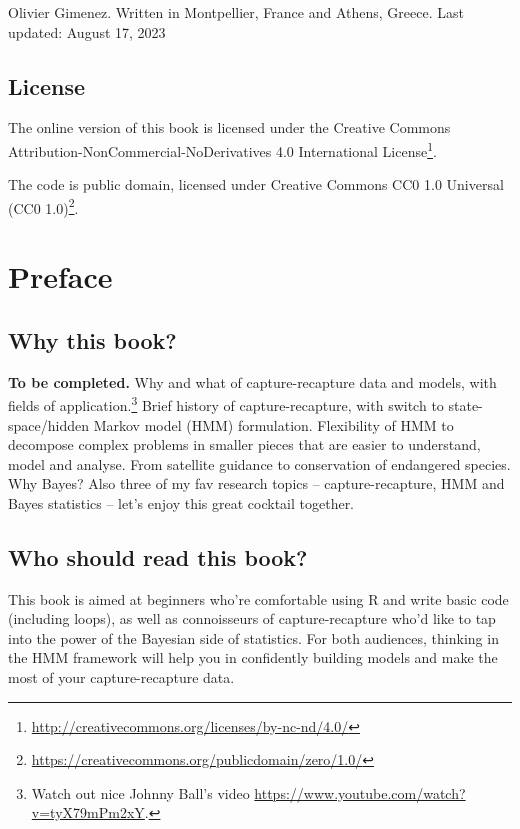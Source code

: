 \documentclass[
  12pt,
]{krantz}
\renewcommand{\href}[2]{#2\footnote{\url{#1}}}
\begin{document}
Olivier Gimenez. Written in Montpellier, France and Athens, Greece.
Last updated: August 17, 2023

\hypertarget{license}{%
\section*{License}\label{license}}


The online version of this book is licensed under the \href{http://creativecommons.org/licenses/by-nc-nd/4.0/}{Creative Commons Attribution-NonCommercial-NoDerivatives 4.0 International License}.

The code is public domain, licensed under \href{https://creativecommons.org/publicdomain/zero/1.0/}{Creative Commons CC0 1.0 Universal (CC0 1.0)}.

\hypertarget{preface}{%
\chapter*{Preface}\label{preface}}


\hypertarget{why-this-book}{%
\section*{Why this book?}\label{why-this-book}}


\textbf{To be completed.} Why and what of capture-recapture data and models, with fields of application.\footnote{Watch out nice Johnny Ball's video \url{https://www.youtube.com/watch?v=tyX79mPm2xY}.} Brief history of capture-recapture, with switch to state-space/hidden Markov model (HMM) formulation. Flexibility of HMM to decompose complex problems in smaller pieces that are easier to understand, model and analyse. From satellite guidance to conservation of endangered species. Why Bayes? Also three of my fav research topics -- capture-recapture, HMM and Bayes statistics -- let's enjoy this great cocktail together.

\hypertarget{who-should-read-this-book}{%
\section*{Who should read this book?}\label{who-should-read-this-book}}


This book is aimed at beginners who're comfortable using R and write basic code (including loops), as well as connoisseurs of capture-recapture who'd like to tap into the power of the Bayesian side of statistics. For both audiences, thinking in the HMM framework will help you in confidently building models and make the most of your capture-recapture data.
\end{document}
